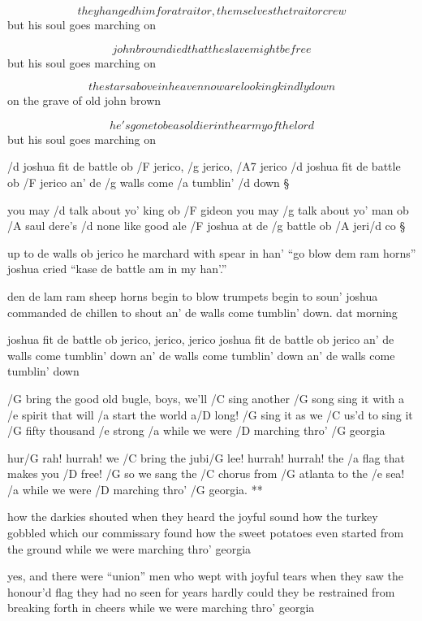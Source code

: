 \[ they hanged him for a traitor, themselves the traitor crew \]
but his soul goes marching on \s

\[ john brown died that the slave might be free \]
but his soul goes marching on \s

\[ the stars above in heaven now are looking kindly down \]
on the grave of old john brown \s

\[ he's gone to be a soldier in the army of the lord \]
but his soul goes marching on \s




/d joshua fit de battle ob /F jerico, /g jerico, /A7 jerico
/d joshua fit de battle ob /F jerico
an' de /g walls come /a tumblin' /d down \S

you may /d talk about yo' king ob /F gideon
you may /g talk about yo' man ob /A saul
dere's /d none like good ale /F joshua
at de /g battle ob /A jeri/d co \S

up to de walls ob jerico
he marchard with spear in han'
``go blow dem ram horns'' joshua cried
``kase de battle am in my han'.'' \s

den de lam ram sheep horns begin to blow
trumpets begin to soun'
joshua commanded de chillen to shout
an' de walls come tumblin' down.  \qquad	dat morning \s

joshua fit de battle ob jerico, jerico, jerico
joshua fit de battle ob jerico
an' de walls come tumblin' down
an' de walls come tumblin' down
an' de walls come tumblin' down




/G bring the good old bugle, boys, we'll /C sing another /G song
sing it with a /e spirit that will /a start the world a/D long!
/G sing it as we /C us'd to sing it /G fifty thousand /e strong
/a while we were /D marching thro' /G georgia

\R  hur/G rah! hurrah! we /C bring the jubi/G lee!
    hurrah! hurrah! the /a flag that makes you /D free!
    /G so we sang the /C chorus from /G atlanta to the /e sea!
    /a while we were /D marching thro' /G georgia. **


how the darkies shouted when they heard the joyful sound
how the turkey gobbled which our commissary found
how the sweet potatoes even started from the ground
while we were marching thro' georgia \s

yes, and there were ``union'' men who wept with joyful tears
when they saw the honour'd flag they had no seen for years
hardly could they be restrained from breaking forth in cheers
while we were marching thro' georgia \s

